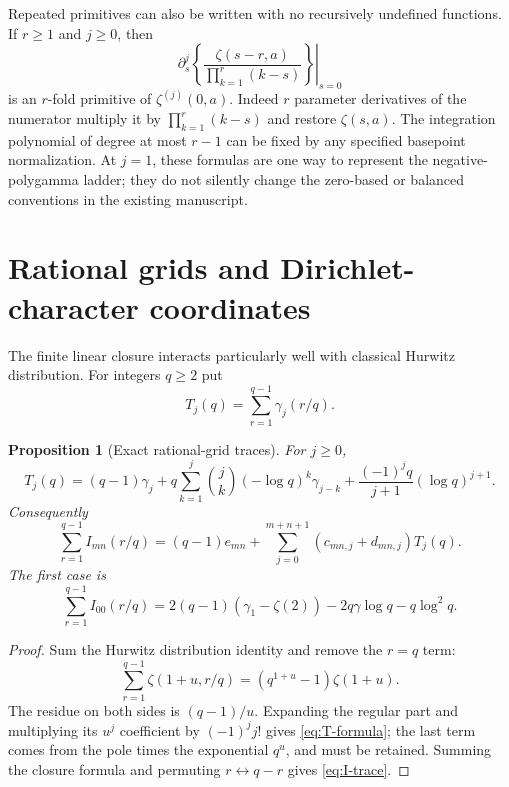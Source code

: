 \documentclass[11pt]{article}
\numberwithin{equation}{section}
\newtheorem{proposition}[theorem]{Proposition}
\theoremstyle{definition}
\theoremstyle{remark}
\begin{document}
Repeated primitives can also be written with no recursively undefined
functions. If $r\ge1$ and $j\ge0$, then
\begin{equation}
 \left.\partial_s^j
 \left\{\frac{\zeta(s-r,a)}{\prod_{k=1}^r(k-s)}\right\}\right|_{s=0}
 \label{eq:repeated-primitive}
\end{equation}
is an $r$-fold primitive of $\zeta^{(j)}(0,a)$.
Indeed $r$ parameter derivatives of the numerator multiply it by
$\prod_{k=1}^r(k-s)$ and restore $\zeta(s,a)$.
The integration polynomial of degree at most $r-1$ can be fixed by any
specified basepoint normalization. At $j=1$, these formulas are one way
to represent the negative-polygamma ladder; they do not silently change
the zero-based or balanced conventions in the existing manuscript.

\section{Rational grids and Dirichlet-character coordinates}
\label{sec:arithmetic}

The finite linear closure interacts particularly well with classical
Hurwitz distribution. For integers $q\ge2$ put
\begin{equation}
 T_j(q)=\sum_{r=1}^{q-1}\gamma_j(r/q).
 \label{eq:T-definition}
\end{equation}

\begin{proposition}[Exact rational-grid traces]
\label{prop:trace}
For $j\ge0$,
\begin{equation}
 T_j(q)=(q-1)\gamma_j+
 q\sum_{k=1}^j\binom{j}{k}(-\log q)^k\gamma_{j-k}
       +\frac{(-1)^j q}{j+1}(\log q)^{j+1}.
 \label{eq:T-formula}
\end{equation}
Consequently
\begin{equation}
 \sum_{r=1}^{q-1}I_{mn}(r/q)
 =(q-1)e_{mn}+\sum_{j=0}^{m+n+1}
                    (c_{mn,j}+d_{mn,j})T_j(q).
 \label{eq:I-trace}
\end{equation}
The first case is
\begin{equation}
 \sum_{r=1}^{q-1}I_{00}(r/q)
 =2(q-1)(\gamma_1-\zeta(2))-2q\gamma\log q-q\log^2q.
 \label{eq:I00-trace}
\end{equation}
\end{proposition}
\begin{proof}
Sum the Hurwitz distribution identity and remove the $r=q$ term:
\[
 \sum_{r=1}^{q-1}\zeta(1+u,r/q)
                         =(q^{1+u}-1)\zeta(1+u).
\]
The residue on both sides is $(q-1)/u$. Expanding the regular part and
multiplying its $u^j$ coefficient by $(-1)^jj!$ gives
\eqref{eq:T-formula}; the last term comes from the pole times the
exponential $q^u$, and must be retained. Summing the closure formula and
permuting $r\leftrightarrow q-r$ gives \eqref{eq:I-trace}.
\end{proof}
\end{document}

